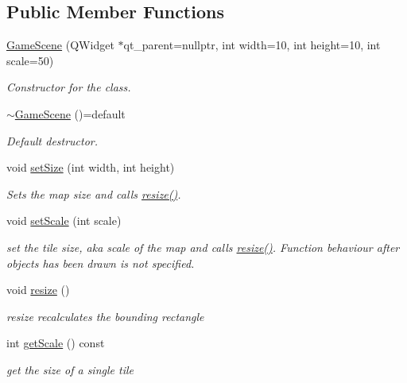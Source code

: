 \subsection*{Public Member Functions}
\begin{DoxyCompactItemize}
\item 
\hyperlink{classGame_1_1GameScene_a397788513ad96151c7fc3fc1642e5a53}{Game\-Scene} (Q\-Widget $\ast$qt\-\_\-parent=nullptr, int width=10, int height=10, int scale=50)
\begin{DoxyCompactList}\small\item\em Constructor for the class. \end{DoxyCompactList}\item 
\hyperlink{classGame_1_1GameScene_ac0ba459a7dd7671847247adf58dcf3b9}{$\sim$\-Game\-Scene} ()=default
\begin{DoxyCompactList}\small\item\em Default destructor. \end{DoxyCompactList}\item 
void \hyperlink{classGame_1_1GameScene_a94918fdf89d865606f1991e1a30d03f3}{set\-Size} (int width, int height)
\begin{DoxyCompactList}\small\item\em Sets the map size and calls \hyperlink{classGame_1_1GameScene_a855792a4b2ef6e6b1217a74806d0332c}{resize()}. \end{DoxyCompactList}\item 
void \hyperlink{classGame_1_1GameScene_a1687397ef51d1d8529fb76011dc14f96}{set\-Scale} (int scale)
\begin{DoxyCompactList}\small\item\em set the tile size, aka scale of the map and calls \hyperlink{classGame_1_1GameScene_a855792a4b2ef6e6b1217a74806d0332c}{resize()}. Function behaviour after objects has been drawn is not specified. \end{DoxyCompactList}\item 
void \hyperlink{classGame_1_1GameScene_a855792a4b2ef6e6b1217a74806d0332c}{resize} ()
\begin{DoxyCompactList}\small\item\em resize recalculates the bounding rectangle \end{DoxyCompactList}\item 
int \hyperlink{classGame_1_1GameScene_a12019298a905ba0a34324b9582b01477}{get\-Scale} () const 
\begin{DoxyCompactList}\small\item\em get the size of a single tile \end{DoxyCompactList}\item 

\end{DoxyCompactItemize}
